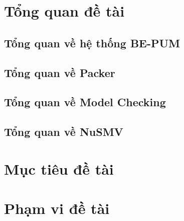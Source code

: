 \section{Tổng quan đề tài}

\subsection{Tổng quan về hệ thống BE-PUM}

\subsection{Tổng quan về Packer}

\subsection{Tổng quan về Model Checking}

\subsection{Tổng quan về NuSMV}

\section{Mục tiêu đề tài}

\section{Phạm vi đề tài}
